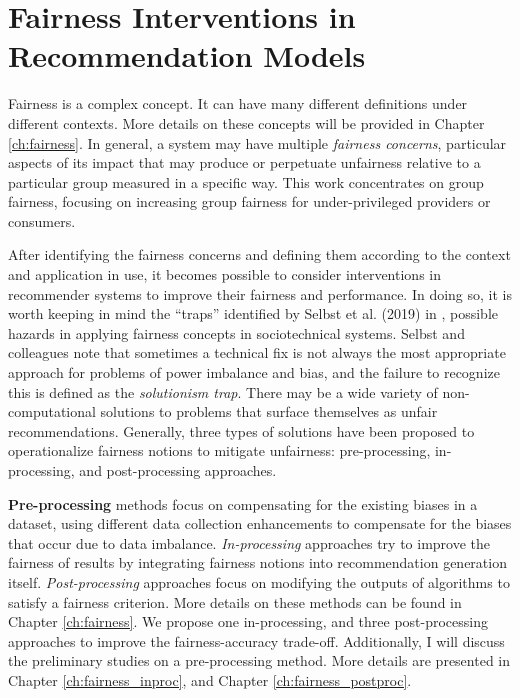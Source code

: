 \section{Fairness Interventions in Recommendation Models}

    Fairness is a complex concept. It can have many different definitions under different contexts. More details on these concepts will be provided in Chapter \ref{ch:fairness}. In general, a system may have multiple \textit{fairness concerns}, particular aspects of its impact that may produce or perpetuate unfairness relative to a particular group measured in a specific way. This work concentrates on group fairness, focusing on increasing group fairness for under-privileged providers or consumers. %
    
    After identifying the fairness concerns and defining them according to the context and application in use, it becomes possible to consider interventions in recommender systems to improve their fairness and performance. In doing so, it is worth keeping in mind the ``traps'' identified by Selbst et al. (2019) in \cite{selbst2019fairness}, possible hazards in applying fairness concepts in sociotechnical systems. Selbst and colleagues note that sometimes a technical fix is not always the most appropriate approach for problems of power imbalance and bias, and the failure to recognize this is defined as the \textit{solutionism trap}. There may be a wide variety of non-computational solutions to problems that surface themselves as unfair recommendations. Generally, three types of solutions have been proposed to operationalize fairness notions to mitigate unfairness: pre-processing, in-processing, and post-processing approaches.
    
    \textbf{Pre-processing} methods focus on compensating for the existing biases in a dataset, using different data collection enhancements to compensate for the biases that occur due to data imbalance. \textit{In-processing} approaches try to improve the fairness of results by integrating fairness notions into recommendation generation itself. \textit{Post-processing} approaches focus on modifying the outputs of algorithms to satisfy a fairness criterion. More details on these methods can be found in Chapter \ref{ch:fairness}. We propose one in-processing, and three post-processing approaches to improve the fairness-accuracy trade-off. Additionally, I will discuss the preliminary studies on a pre-processing method. More details are presented in Chapter \ref{ch:fairness_inproc}, and Chapter \ref{ch:fairness_postproc}. 

